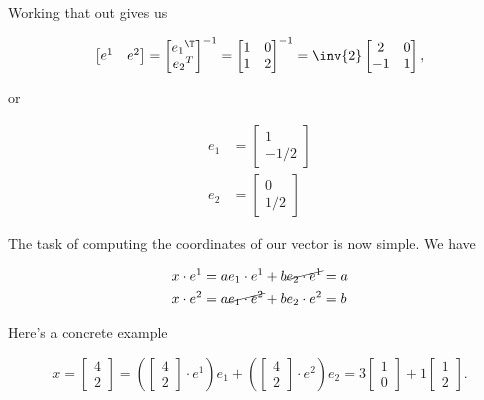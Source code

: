 \documentclass[iop,tighten]{emulateapj}
\begin{document}
Working that out gives us

\begin{equation}\label{eqn:grahamSchmidtLorentz:170}
\begin{bmatrix}
e^1 & e^2
\end{bmatrix}
=
{
\begin{bmatrix}
{e_1}^\T \\
{e_2}^T
\end{bmatrix}
}^{-1}
= 
{\begin{bmatrix}
1 & 0 \\
1 & 2
\end{bmatrix}}^{-1}
= 
\inv{2} 
\begin{bmatrix}
2 & 0 \\
-1 & 1
\end{bmatrix},
\end{equation}

or

\begin{equation}\label{eqn:grahamSchmidtLorentz:190}
\begin{aligned}
e_1 &= 
\begin{bmatrix}
1 \\
-1/2
\end{bmatrix} \\
e_2 &= 
\begin{bmatrix}
0 \\
1/2
\end{bmatrix} 
\end{aligned}
\end{equation}

The task of computing the coordinates of our vector is now simple.  We have

\begin{equation}\label{eqn:grahamSchmidtLorentz:340}
\begin{aligned}
x \cdot e^1 &= a e_1 \cdot e^1 + b \cancel{e_2 \cdot e^1} = a \\
x \cdot e^2 &= a \cancel{e_1 \cdot e^2} + b e_2 \cdot e^2 = b
\end{aligned}
\end{equation}

Here's a concrete example

\begin{equation}\label{eqn:grahamSchmidtLorentz:230}
x = 
\begin{bmatrix}
4 \\
2
\end{bmatrix} 
=
\left(
\begin{bmatrix}
4 \\
2
\end{bmatrix} 
\cdot e^1 
\right)
e_1
+
\left(
\begin{bmatrix}
4 \\
2
\end{bmatrix} 
\cdot e^2
\right)
e_2
= 3 
\begin{bmatrix}
1 \\
0
\end{bmatrix} 
+ 
1
\begin{bmatrix}
1 \\
2
\end{bmatrix}.
\end{equation}
\end{document}
